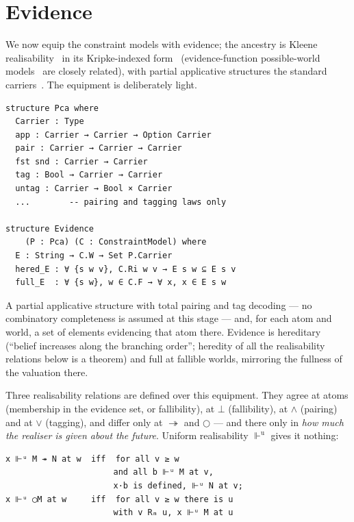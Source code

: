 \section{Evidence}\label{4-evidence}

We now equip the constraint models with evidence; the ancestry is
Kleene realisability~\cite{Kleene1945,Troelstra1973,Troelstra1998,
TroelstraVanDalen1988} in its Kripke-indexed form~\cite{Lipton1992}
(evidence-function possible-world
models~\cite{Fitting2005,MarinPadhiarShillito2026} are closely
related), with partial applicative
structures the standard carriers~\cite{VanOosten2008}. The equipment
is deliberately light.

\begin{lstlisting}
structure Pca where
  Carrier : Type
  app : Carrier → Carrier → Option Carrier
  pair : Carrier → Carrier → Carrier
  fst snd : Carrier → Carrier
  tag : Bool → Carrier → Carrier
  untag : Carrier → Bool × Carrier
  ...        -- pairing and tagging laws only

structure Evidence
    (P : Pca) (C : ConstraintModel) where
  E : String → C.W → Set P.Carrier
  hered_E : ∀ {s w v}, C.Ri w v → E s w ⊆ E s v
  full_E  : ∀ {s w}, w ∈ C.F → ∀ x, x ∈ E s w
\end{lstlisting}

A partial applicative structure with total pairing and tag decoding ---
no combinatory completeness is assumed at this stage --- and, for each
atom and world, a set of elements evidencing that atom there. Evidence
is hereditary (``belief increases along the branching order''; heredity
of all the realisability relations below is a theorem) and full at
fallible worlds, mirroring the fullness of the valuation there.

Three realisability relations are defined over this equipment. They
agree at atoms (membership in the evidence set, or fallibility), at
\ensuremath{\bot} (fallibility), at \ensuremath{\wedge} (pairing) and at \ensuremath{\vee} (tagging), and differ only
at \ensuremath{\twoheadrightarrow} and \ensuremath{\bigcirc} --- and there only in \emph{how much the realiser is given about the
future}. Uniform realisability \ensuremath{\Vdash^{\mathrm{u}}} gives it nothing:

\begin{lstlisting}
x ⊩ᵘ M ↠ N at w  iff  for all v ≥ w
                      and all b ⊩ᵘ M at v,
                      x·b is defined, ⊩ᵘ N at v;
x ⊩ᵘ ◯M at w     iff  for all v ≥ w there is u
                      with v Rₘ u, x ⊩ᵘ M at u
\end{lstlisting}

